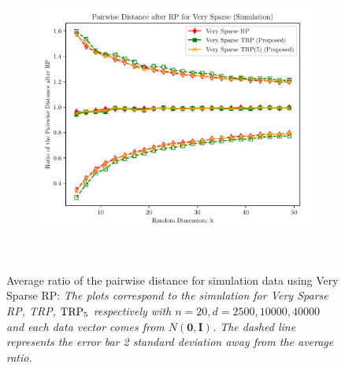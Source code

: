 \begin{figure}[ht!]
\begin{subfigure}{0.32\textwidth}
		\includegraphics[scale = 0.3]{figure/dist_sp1_d40000.pdf}
	\end{subfigure}\\
	\caption{Average ratio of the pairwise distance for simulation data using Very Sparse RP: \textit{The plots correspond to the simulation for Very Sparse RP, TRP, $\textup{TRP}_5$ respectively with $n = 20, d = 2500, 10000, 40000$ and each data vector comes from $N(\mathbf{0}, \mathbf{I})$. The dashed line represents the error bar 2 standard deviation away from the average ratio.}} 
	\label{fig:very_sparse}
\end{figure}

